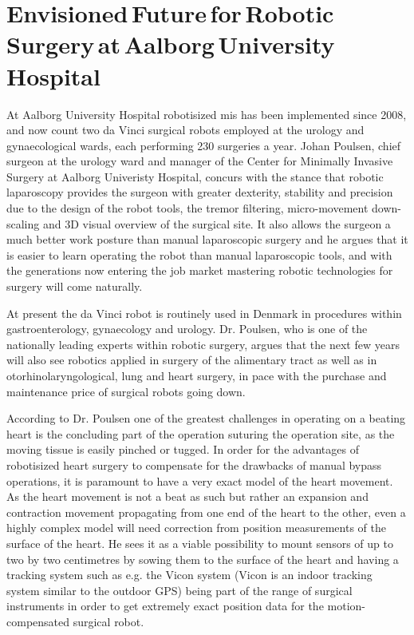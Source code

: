 \section{Envisioned\,Future\,for\,Robotic\,Surgery\,at\,Aalborg\,University\,Hospital}\label{sec:aau_doc}

At Aalborg University Hospital robotisized \gls{mis} has been implemented since 2008, and now count two da Vinci surgical robots employed at the urology and gynaecological wards, each performing 230 surgeries a year. %
Johan Poulsen, chief surgeon at the urology ward and manager of the Center for Minimally Invasive Surgery at Aalborg Univeristy Hospital, concurs with the stance that robotic laparoscopy provides the surgeon with greater dexterity, stability and precision due to the design of the robot tools, the tremor filtering, micro-movement down-scaling %
and 3D visual overview of the surgical site.  %
It also allows the surgeon a much better work posture than manual laparoscopic surgery and he argues that it is easier to learn operating the robot than manual laparoscopic tools, %
and with the generations now entering the job market mastering  robotic technologies for surgery will come naturally.


At present the da Vinci robot is routinely used in Denmark in procedures within gastroenterology, gynaecology and urology. Dr. Poulsen, who is one of the nationally leading experts within robotic surgery, argues that the next few years will also see robotics applied in surgery of the alimentary tract as well as in otorhinolaryngological, lung and heart surgery, in pace with the purchase and maintenance price of surgical robots going down.

According to Dr. Poulsen one of the greatest challenges in operating on a beating heart is the concluding part of the operation suturing the operation site, as the moving tissue is easily pinched or tugged. 
In order for the advantages of robotisized heart surgery to compensate for the drawbacks of manual bypass operations, it is paramount to have a very exact model of the heart movement. 
As the heart movement is not a beat as such but rather an expansion and contraction movement propagating from one end of the heart to the other, even a highly complex model will need correction from position measurements of the surface of the heart. 
He sees it as a viable possibility to mount sensors of up to two by two centimetres by sowing them to the surface of the heart and having a tracking system such as e.g. the Vicon system (Vicon is an indoor tracking system similar to the outdoor GPS) being part of the range of surgical instruments in order to get extremely exact position data for the motion-compensated surgical robot.



